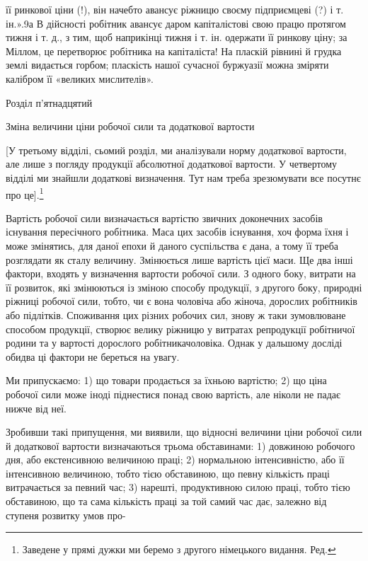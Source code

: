 \parcont{}  %
її ринкової ціни (!), він начебто авансує ріжницю своєму підприємцеві
(?) і т. ін.».9а В дійсності робітник авансує даром
капіталістові свою працю протягом тижня і т. д., з тим, щоб
наприкінці тижня і т. ін. одержати її ринкову ціну; за Міллом,
це перетворює робітника на капіталіста! На пласкій рівнині
й грудка землі видається горбом; пласкість нашої сучасної буржуазії
можна зміряти калібром її «великих мислителів».

Розділ п’ятнадцятий

Зміна величини ціни робочої сили та додаткової
вартости

[У третьому відділі, сьомий розділ, ми аналізували норму
додаткової вартости, але лише з погляду продукції абсолютної
додаткової вартости. У четвертому відділі ми знайшли додаткові
визначення. Тут нам треба зрезюмувати все посутнє про це].\footnote*{
Заведене у прямі дужки ми беремо з другого німецького видання.
Ред.
}

Вартість робочої сили визначається вартістю звичних доконечних
засобів існування пересічного робітника. Маса цих засобів
існування, хоч форма їхня і може змінятись, для даної епохи
й даного суспільства є дана, а тому її треба розглядати як сталу
величину. Змінюється лише вартість цієї маси. Ще два інші
фактори, входять у визначення вартости робочої сили. З одного
боку, витрати на її розвиток, які змінюються із зміною способу
продукції, з другого боку, природні ріжниці робочої сили, тобто,
чи є вона чоловіча або жіноча, дорослих робітників або підлітків.
Споживання цих різних робочих сил, знову ж таки зумовлюване
способом продукції, створює велику ріжницю у витратах репродукції
робітничої родини та у вартості дорослого робітникачоловіка.
Однак у дальшому досліді обидва ці фактори не береться
на увагу.

Ми припускаємо: 1) що товари продається за їхньою вартістю;
2) що ціна робочої сили може іноді піднестися понад свою вартість,
але ніколи не падає нижче від неї.

Зробивши такі припущення, ми виявили, що відносні величини
ціни робочої сили й додаткової вартости визначаються
трьома обставинами: 1) довжиною робочого дня, або екстенсивною
величиною праці; 2) нормальною інтенсивністю, або її інтенсивною
величиною, тобто тією обставиною, що певну кількість
праці витрачається за певний час; 3) нарешті, продуктивною
силою праці, тобто тією обставиною, що та сама кількість праці
за той самий час дає, залежно від ступеня розвитку умов про-


